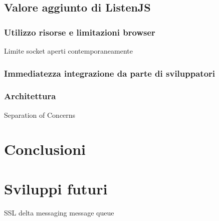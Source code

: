 \documentclass[12pt,a4paper,openright,twoside]{report}
\begin{document}
\section{Valore aggiunto di ListenJS}\label{sec_valorelistenjs}

\subsection{Utilizzo risorse e limitazioni browser}
Limite socket aperti contemporaneamente

\subsection{Immediatezza integrazione da parte di sviluppatori}

\subsection{Architettura}
Separation of Concerns

\clearpage{\pagestyle{empty}\cleardoublepage}
\chapter*{Conclusioni}

\chapter*{Sviluppi futuri}
SSL
delta messaging
message queue
\clearpage{\pagestyle{empty}\cleardoublepage}




\end{document}
